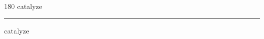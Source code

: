 
\begin{frame}
\begin{center}
\begin{turn}{180}
{\fontsize{2.5cm}{1em}\selectfont catalyze}
\end{turn}
\vspace{1em}\par  
\hrule
\vspace{1em}\par  
{\fontsize{2.5cm}{1em}\selectfont catalyze}
\end{center}
\end{frame}
